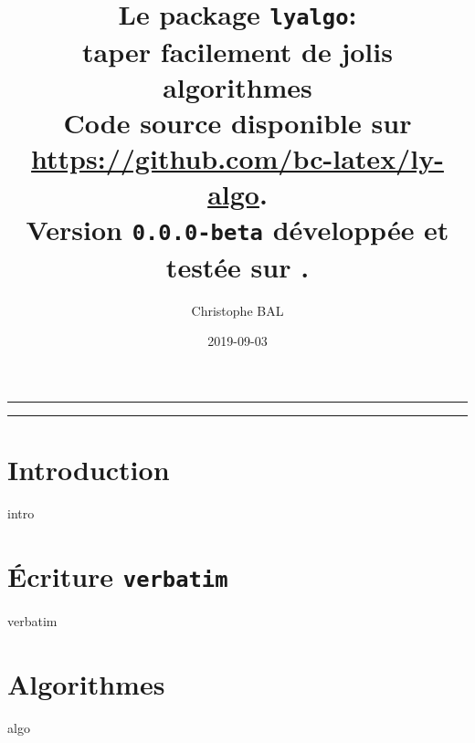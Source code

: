 \documentclass[12pt,a4paper]{article}
\begin{document}
\title{%
	Le package \texttt{lyalgo}:
	\\
	taper facilement de jolis algorithmes
	\\
	{
		\footnotesize Code source disponible 
		sur \url{https://github.com/bc-latex/ly-algo}.%
	}
	\\
	{
		\footnotesize Version \texttt{0.0.0-beta}
		développée et testée sur \macosxname{}.%
	}
}

\author{Christophe BAL}
\date{2019-09-03}

\maketitle


\vspace{2em}

\hrule

\tableofcontents

\vspace{1.5em}

\hrule

\newpage





\section{Introduction}

{intro}







\section{Écriture \texttt{verbatim}}

{verbatim}




\section{Algorithmes}

{algo}
\end{document}
